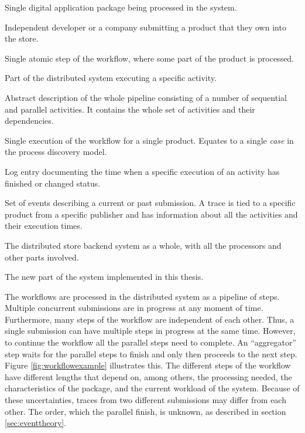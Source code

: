 \begin{description}[style=nextline]
\item[Product] 
Single digital application package being processed in the system. 

\item[Publisher] 
Independent developer or a company submitting a product that they own into the store.

\item[Activity] 
Single atomic step of the workflow, where some part of the product is processed. 

\item[Processor] 
Part of the distributed system executing a specific activity.

\item[Workflow]
Abstract description of the whole pipeline consisting of a number of sequential and parallel activities. It contains the whole set of activities and their dependencies.

\item[Submission] 
Single execution of the workflow for a single product. Equates to a single \emph{case} in the process discovery model.

\item[Event] 
Log entry documenting the time when a specific execution of an activity has finished or changed status. 

\item[Trace] 
Set of events describing a current or past submission. 
A trace is tied to a specific product from a specific publisher and has information about all the activities and their execution times. 

\item[System] 
The distributed store backend system as a whole, with all the processors and other parts involved.

\item[Project] 
The new part of the system implemented in this thesis.

\label{desc:termdefinitions}
\end{description}


The workflows are processed in the distributed system as a pipeline of steps. 
Multiple concurrent submissions are in progress at any moment of time.
Furthermore, many steps of the workflow are independent of each other.
Thus, a single submission can have multiple steps in progress at the same time.
However, to continue the workflow all the parallel steps need to complete.
An ``aggregator'' step waits for the parallel steps to finish and only then proceeds to the next step. 
Figure \ref{fig:workflowexample} illustrates this.
The different steps of the workflow have different lengths that depend on, among others,
the processing needed, the characteristics of the package, and the current workload of the system.
Because of these uncertainties, traces from two different submissions may differ from each other.
The order, which the parallel finish, is unknown, as described in section \ref{sec:eventtheory}.


